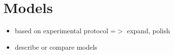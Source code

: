 \section{Models}

\begin{itemize}
  \item based on experimental protocol =$>$ expand, polish
  \item describe or compare models
\end{itemize}